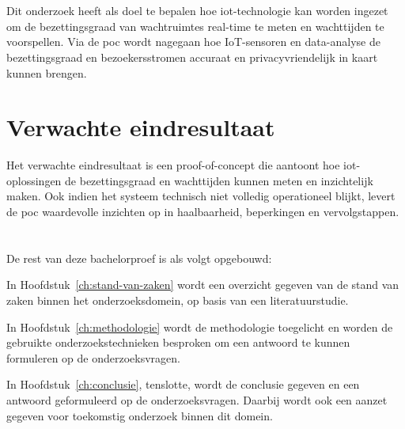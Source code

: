 \section{}%
\label{sec:onderzoeksdoelstelling}
Dit onderzoek heeft als doel te bepalen hoe \gls{iot}-technologie kan worden ingezet om de bezettingsgraad van wachtruimtes real-time te meten en wachttijden te voorspellen. Via de \gls{poc} wordt nagegaan hoe IoT-sensoren en data-analyse de bezettingsgraad en bezoekersstromen accuraat en privacyvriendelijk in kaart kunnen brengen.


\section{Verwachte eindresultaat} 
Het verwachte eindresultaat is een proof-of-concept die aantoont hoe \gls{iot}-oplossingen de bezettingsgraad en wachttijden kunnen meten en inzichtelijk maken. Ook indien het systeem technisch niet volledig operationeel blijkt, levert de \gls{poc} waardevolle inzichten op in haalbaarheid, beperkingen en vervolgstappen.


\section{}%
\label{sec:opzet-bachelorproef}


De rest van deze bachelorproef is als volgt opgebouwd:

In Hoofdstuk~\ref{ch:stand-van-zaken} wordt een overzicht gegeven van de stand van zaken binnen het onderzoeksdomein, op basis van een literatuurstudie.

In Hoofdstuk~\ref{ch:methodologie} wordt de methodologie toegelicht en worden de gebruikte onderzoekstechnieken besproken om een antwoord te kunnen formuleren op de onderzoeksvragen.


In Hoofdstuk~\ref{ch:conclusie}, tenslotte, wordt de conclusie gegeven en een antwoord geformuleerd op de onderzoeksvragen. Daarbij wordt ook een aanzet gegeven voor toekomstig onderzoek binnen dit domein.